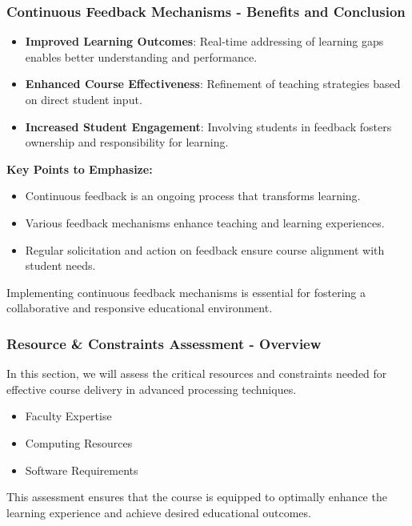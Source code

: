 \documentclass[aspectratio=169]{beamer}
\begin{document}
\begin{frame}[fragile]
    \frametitle{Continuous Feedback Mechanisms - Benefits and Conclusion}
    \begin{itemize}
        \item \textbf{Improved Learning Outcomes}: Real-time addressing of learning gaps enables better understanding and performance.
        \item \textbf{Enhanced Course Effectiveness}: Refinement of teaching strategies based on direct student input.
        \item \textbf{Increased Student Engagement}: Involving students in feedback fosters ownership and responsibility for learning.
    \end{itemize}
    
    \textbf{Key Points to Emphasize:}
    \begin{itemize}
        \item Continuous feedback is an ongoing process that transforms learning.
        \item Various feedback mechanisms enhance teaching and learning experiences.
        \item Regular solicitation and action on feedback ensure course alignment with student needs.
    \end{itemize}

    Implementing continuous feedback mechanisms is essential for fostering a collaborative and responsive educational environment.
\end{frame}

\begin{frame}[fragile]
    \frametitle{Resource \& Constraints Assessment - Overview}
    In this section, we will assess the critical resources and constraints needed for effective course delivery in advanced processing techniques. 
    \begin{itemize}
        \item Faculty Expertise
        \item Computing Resources
        \item Software Requirements
    \end{itemize}
    This assessment ensures that the course is equipped to optimally enhance the learning experience and achieve desired educational outcomes.
\end{frame}
\end{document}
